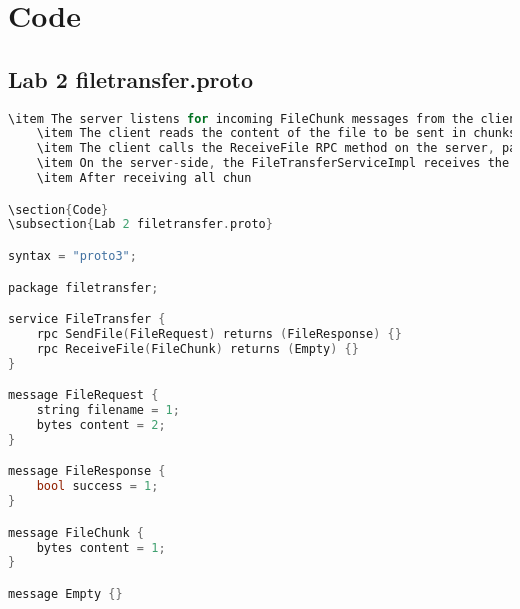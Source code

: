 \documentclass{article}
\begin{document}
\section{Code}

\subsection{ Lab 2 filetransfer.proto }

\begin{lstlisting}[language=C++, caption=filetransfer C++ Code, label=lst:code]
    \item The server listens for incoming FileChunk messages from the client.
    \item The client reads the content of the file to be sent in chunks and constructs FileChunk messages.
    \item The client calls the ReceiveFile RPC method on the server, passing FileChunk messages containing file content.
    \item On the server-side, the FileTransferServiceImpl receives the FileChunk messages, extracts the content, and appends it to the file being received.
    \item After receiving all chun

\section{Code}
\subsection{Lab 2 filetransfer.proto}

syntax = "proto3";

package filetransfer;

service FileTransfer {
    rpc SendFile(FileRequest) returns (FileResponse) {}
    rpc ReceiveFile(FileChunk) returns (Empty) {}
}

message FileRequest {
    string filename = 1;
    bytes content = 2;
}

message FileResponse {
    bool success = 1;
}

message FileChunk {
    bytes content = 1;
}

message Empty {}
\end{lstlisting}
\end{document}
